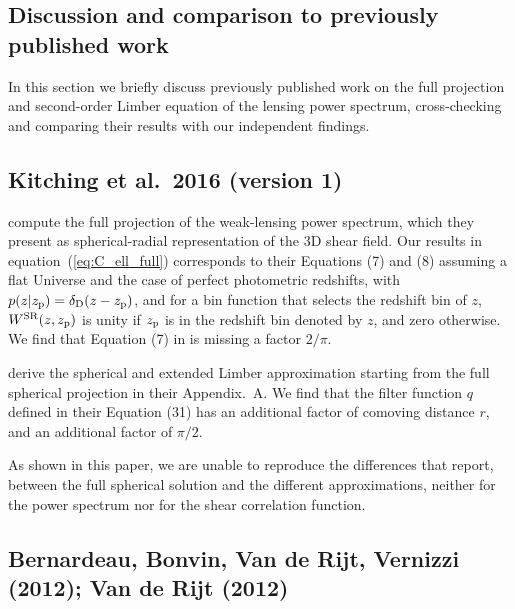 \documentclass[fleqn,usenatbib]{mnras} %
\begin{document}
\begin{appendix}
\section{Discussion and comparison to previously published work}
\label{app:B}

In this section we briefly discuss previously published work on the full
projection and second-order Limber equation of the lensing power spectrum, cross-checking and comparing their
results with our independent findings.


\subsection{Kitching et al.~2016 (version 1)}

\cite{2016arXiv161104954K} compute the full projection of the weak-lensing
power spectrum, which they present as spherical-radial representation of the 3D
shear field. Our results in equation~(\ref{eq:C_ell_full}) corresponds to their
Equations (7) and (8) assuming a flat Universe and the case of perfect
photometric redshifts, with $p(z | z_{\rm p}) = \delta_{\rm D}(z - z_{\rm p})$,
and for a bin function that selects the redshift bin of $z$, $W^{\rm SR}(z,
z_{\rm p})$ is unity if $z_{\rm p}$ is in the redshift bin denoted by $z$,
and zero otherwise. We find that Equation (7) in \cite{2016arXiv161104954K} is
missing a factor $2/\pi$.

\cite{2016arXiv161104954K} derive the spherical and extended Limber
approximation starting from the full spherical projection in their Appendix.~A.
We find that the filter function $q$ defined in their Equation (31) has an
additional factor of comoving distance $r$, and an additional factor of
$\pi/2$.

As shown in this paper, we are unable to reproduce the differences that
\cite{2016arXiv161104954K} report, between the full spherical solution and the
different approximations, neither for the power spectrum nor for the shear
correlation function.


\subsection{Bernardeau, Bonvin, Van de Rijt, Vernizzi (2012); Van de Rijt (2012)}


\end{appendix}
\end{document}
